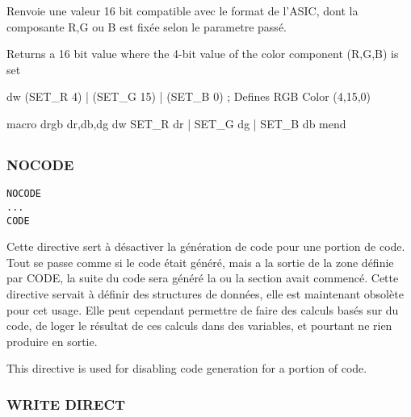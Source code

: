 \begin{xfr}
Renvoie une valeur 16 bit compatible avec le format de l'ASIC, dont la composante R,G ou B est fixée selon le parametre passé.
\end{xfr}

\begin{xen}
Returns a 16 bit value where the 4-bit value of the color component (R,G,B) is set
\end{xen}

\begin{code}
  dw (SET\_R 4) | (SET\_G 15) | (SET\_B 0) ; Defines RGB Color  (4,15,0)
\end{code}
\begin{code}
  macro drgb dr,db,dg
  dw SET\_R {dr} | SET\_G {dg} | SET\_B {db}
  mend
\end{code}


\subsection{}

\subsubsection{NOCODE}
\begin{verbatim}
NOCODE
...
CODE
\end{verbatim}

\begin{xfr}
  Cette directive sert à désactiver la génération de code pour une portion de code. Tout se passe comme si le code était généré, mais a la sortie de la zone définie par CODE, la suite du code sera généré la ou la section avait commencé.
  Cette directive servait à définir des structures de données, elle est maintenant obsolète pour cet usage. Elle peut cependant permettre de faire des calculs basés sur du code, de loger le résultat de ces calculs dans des variables, et pourtant ne rien produire en sortie.
\end{xfr}

\begin{xen}
This directive is used for disabling code generation for a portion of code.
\end{xen}

\subsubsection{WRITE DIRECT}

